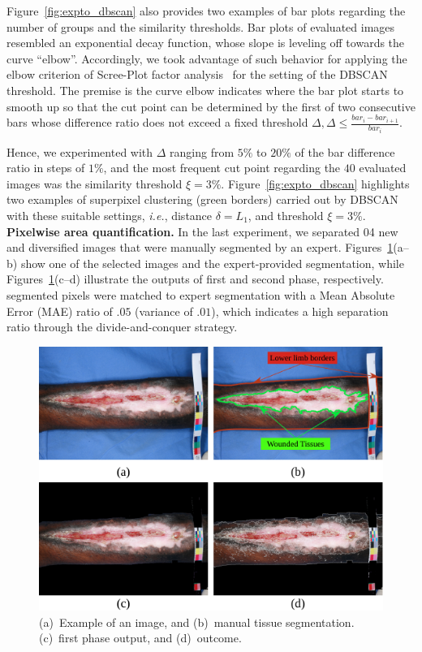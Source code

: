 Figure~\ref{fig:expto_dbscan} also provides two examples of bar plots regarding the number of groups and the similarity thresholds.
Bar plots of evaluated images resembled an exponential decay function, whose slope is leveling off towards the curve ``elbow''.
Accordingly, we took advantage of such behavior for applying the elbow criterion of Scree-Plot factor analysis~\cite{Jolliffe2011} for the setting of the DBSCAN threshold.
The premise is the curve elbow indicates where the bar plot starts to smooth up so that the cut point can be determined by the first of two consecutive bars whose difference ratio does not exceed a fixed threshold $\Delta, \Delta \leq \frac{bar_i - bar_{i+1}}{bar_i}$.

Hence, we experimented with $\Delta$ ranging from $5\%$ to $20\%$ of the bar difference ratio in steps of $1\%$, and the most frequent cut point regarding the $40$ evaluated images was the similarity threshold $\xi = 3\%$.
Figure~\ref{fig:expto_dbscan} highlights two examples of superpixel clustering (green borders) carried out by DBSCAN with these suitable settings, \textit{i.e.}, distance $\delta = L_1$, and threshold $\xi = 3\%$.\\

\noindent
\textbf{Pixelwise area quantification.} 
In the last experiment, we separated 04 new and diversified \dataset images that were manually segmented by an expert.
Figures~\ref{fig:quantification}(a--b) show one of the selected images and the expert-provided segmentation, while Figures~\ref{fig:quantification}(c--d) illustrate the outputs of \system first and second phase, respectively.
\system segmented pixels were matched to expert segmentation with a Mean Absolute Error (MAE) ratio of $.05$  (variance of $.01$), which indicates a high separation ratio through the divide-and-conquer strategy.

\begin{figure}[!htb]
\centering
\includegraphics[scale=.96]{figs/quantification1.pdf}
\vspace{-8px}
\caption{(a)~Example of an \dataset image, and
(b)~manual tissue segmentation.
(c)~\system first phase output, and
(d)~\system outcome.}
\label{fig:quantification}
\end{figure}





